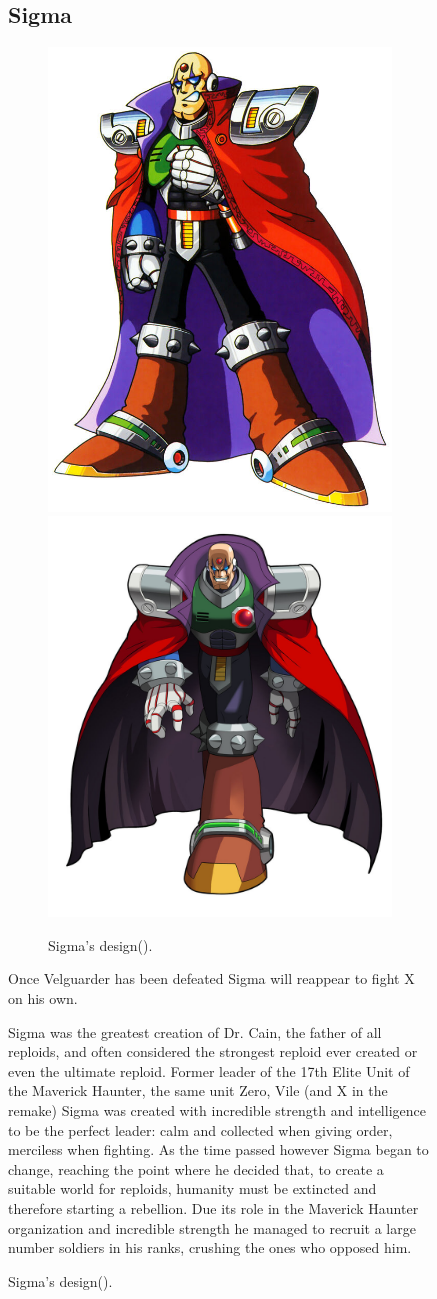 \begin{figure}[htp]
\subsection{Sigma}\label{boss:Sigma_x1}
\begin{figure}[htp]
	\centering
	\includegraphics[width=0.4\linewidth]{figures/X1/Sigma_stages/Sigma.jpg}
	\includegraphics[width=0.5\linewidth]{figures/X1/Sigma_stages/MHXSigma.jpg}
	\caption{Sigma's design(\cite{book:MMX_Complete_art}).}
\end{figure}
Once Velguarder has been defeated Sigma will reappear to fight X on his own.

Sigma was the greatest creation of Dr. Cain, the father of all reploids, and often considered the strongest reploid ever created\cite{wayback:X_resources} or even the ultimate reploid\cite{MHX:manual}. Former leader of the 17th Elite Unit of the Maverick Haunter, the same unit Zero, Vile (and X in the remake) Sigma was created with incredible strength and intelligence  to be the perfect leader: calm and collected when giving order, merciless when fighting\cite{Xcoll1:Manual_X1}. As the time passed however Sigma began to change, reaching the point where he decided that, to create a suitable world for reploids, humanity must be extincted and therefore starting a rebellion. Due its role in the Maverick Haunter organization and incredible strength he managed to recruit a large number soldiers in his ranks, crushing the ones who opposed him. 


\end{figure}
